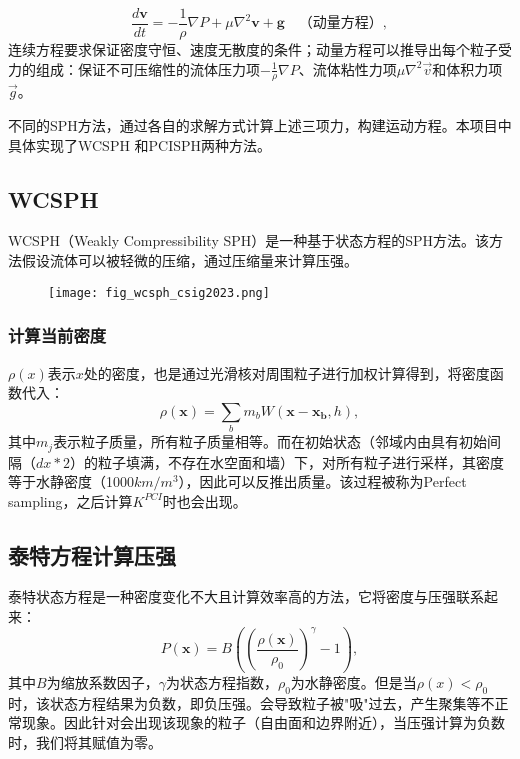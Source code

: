 \begin{equation}
	\frac{d\boldsymbol{v}}{dt}=-\frac{1}{\rho}\nabla P + \mu\nabla ^2\boldsymbol{v}+ \boldsymbol{g} \quad\text{（动量方程）},
\end{equation}
连续方程要求保证密度守恒、速度无散度的条件；动量方程可以推导出每个粒子受力的组成：保证不可压缩性的流体压力项$-\frac{1}{\rho}\nabla P$、流体粘性力项$\mu\nabla^2\vec{v}$和体积力项$\vec{g}$。

不同的SPH方法，通过各自的求解方式计算上述三项力，构建运动方程。本项目中具体实现了WCSPH 和PCISPH两种方法。


\subsection{WCSPH}
WCSPH（Weakly Compressibility SPH）是一种基于状态方程的SPH方法。该方法假设流体可以被轻微的压缩，通过压缩量来计算压强。

\begin{figure}[H]
	\centering
	\texttt{[image: fig\_wcsph\_csig2023.png]}
\end{figure}

\subsubsection{计算当前密度}
$\rho(x)$表示$x$处的密度，也是通过光滑核对周围粒子进行加权计算得到，将密度函数代入：
\begin{equation}
	\rho(\boldsymbol{x})=\sum_{b}m_bW(\boldsymbol{x}-\boldsymbol{x_b},h),
\end{equation}
其中$m_j$表示粒子质量，所有粒子质量相等。而在初始状态（邻域内由具有初始间隔（$dx*2$）的粒子填满，不存在水空面和墙）下，对所有粒子进行采样，其密度等于水静密度（1000$km/m^3$），因此可以反推出质量。该过程被称为Perfect sampling，之后计算$K^{PCI}$时也会出现。
\subsection{泰特方程计算压强}
泰特状态方程是一种密度变化不大且计算效率高的方法，它将密度与压强联系起来：
\begin{equation}
	P(\boldsymbol{x})=B((\frac{\rho(\boldsymbol{x})}{\rho_0})^{\gamma}-1),
\end{equation}
其中$B$为缩放系数因子，$\gamma$为状态方程指数，$\rho_0$为水静密度。但是当$\rho(x)<\rho_0$时，该状态方程结果为负数，即负压强。会导致粒子被"吸"过去，产生聚集等不正常现象。因此针对会出现该现象的粒子（自由面和边界附近），当压强计算为负数时，我们将其赋值为零。

